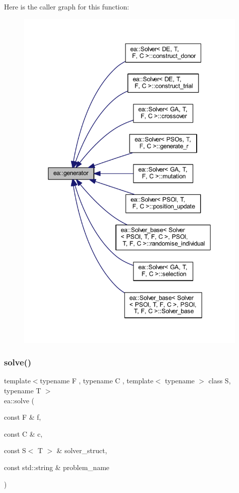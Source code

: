 Here is the caller graph for this function\+:
\nopagebreak
\begin{figure}[H]
\begin{center}
\leavevmode
\includegraphics[width=344pt]{namespaceea_a385e8ca8ba4ae2f69dcfffa79f20c2ff_icgraph}
\end{center}
\end{figure}
\mbox{\label{namespaceea_a6450b5bf61e9fdca8b6c19267e14c560}} 
\subsubsection{\texorpdfstring{solve()}{solve()}}
{\footnotesize\ttfamily template$<$typename F , typename C , template$<$ typename $>$ class S, typename T $>$ \\
ea\+::solve (\begin{DoxyParamCaption}\item[{const F \&}]{f,  }\item[{const C \&}]{c,  }\item[{const S$<$ T $>$ \&}]{solver\+\_\+struct,  }\item[{const std\+::string \&}]{problem\+\_\+name }\end{DoxyParamCaption})}



